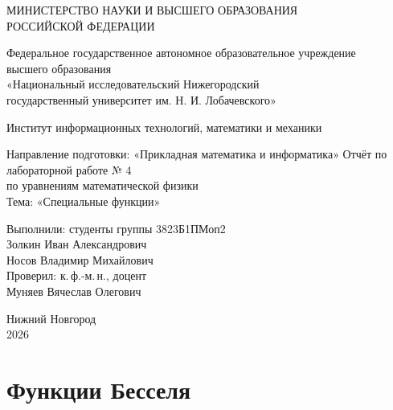 \documentclass[12pt,a4paper]{article}
\begin{document}
\begin{titlepage}
\begin{center}
\small МИНИСТЕРСТВО НАУКИ И ВЫСШЕГО ОБРАЗОВАНИЯ\\
РОССИЙСКОЙ ФЕДЕРАЦИИ\par
\vspace{5mm}
Федеральное государственное автономное образовательное учреждение\\
высшего образования\\
«Национальный исследовательский Нижегородский\\
государственный университет им. Н. И. Лобачевского»\par
\vspace{5mm}
Институт информационных технологий, математики и механики\par
Направление подготовки: «Прикладная математика и информатика»
\vfill
{\large Отчёт по лабораторной работе № 4\\[4mm]
по уравнениям математической физики\\[5mm]
Тема: «Специальные функции»}
\end{center}
\vspace{15mm}
\begin{flushright}
Выполнили: студенты группы 3823Б1ПМоп2\\
Золкин Иван Александрович\\
Носов Владимир Михайлович\\[5mm]
Проверил: к.\,ф.-м.\,н., доцент\\
Муняев Вячеслав Олегович
\end{flushright}
\vfill
\begin{center}Нижний Новгород\\2026\end{center}
\end{titlepage}

\tableofcontents
\clearpage
\section{Функции Бесселя}
\end{document}
